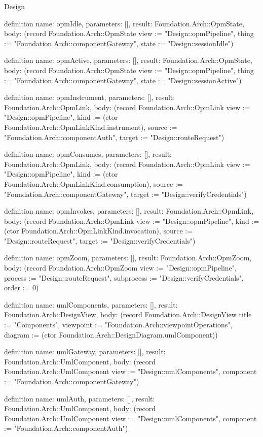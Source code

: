 \begin{lexlean}{Design}
\begin{semanticmodule}
definition{
  name: opmIdle,
  parameters: [],
  result: Foundation.Arch::OpmState,
  body: (record Foundation.Arch::OpmState {view := "Design::opmPipeline", thing := "Foundation.Arch::componentGateway", state := "Design::sessionIdle"})
}

definition{
  name: opmActive,
  parameters: [],
  result: Foundation.Arch::OpmState,
  body: (record Foundation.Arch::OpmState {view := "Design::opmPipeline", thing := "Foundation.Arch::componentGateway", state := "Design::sessionActive"})
}

definition{
  name: opmInstrument,
  parameters: [],
  result: Foundation.Arch::OpmLink,
  body: (record Foundation.Arch::OpmLink {view := "Design::opmPipeline", kind := (ctor Foundation.Arch::OpmLinkKind.instrument), source := "Foundation.Arch::componentAuth", target := "Design::routeRequest"})
}

definition{
  name: opmConsumes,
  parameters: [],
  result: Foundation.Arch::OpmLink,
  body: (record Foundation.Arch::OpmLink {view := "Design::opmPipeline", kind := (ctor Foundation.Arch::OpmLinkKind.consumption), source := "Foundation.Arch::componentGateway", target := "Design::verifyCredentials"})
}

definition{
  name: opmInvokes,
  parameters: [],
  result: Foundation.Arch::OpmLink,
  body: (record Foundation.Arch::OpmLink {view := "Design::opmPipeline", kind := (ctor Foundation.Arch::OpmLinkKind.invocation), source := "Design::routeRequest", target := "Design::verifyCredentials"})
}

definition{
  name: opmZoom,
  parameters: [],
  result: Foundation.Arch::OpmZoom,
  body: (record Foundation.Arch::OpmZoom {view := "Design::opmPipeline", process := "Design::routeRequest", subprocess := "Design::verifyCredentials", order := 0})
}

definition{
  name: umlComponents,
  parameters: [],
  result: Foundation.Arch::DesignView,
  body: (record Foundation.Arch::DesignView {title := "Components", viewpoint := "Foundation.Arch::viewpointOperations", diagram := (ctor Foundation.Arch::DesignDiagram.umlComponent)})
}

definition{
  name: umlGateway,
  parameters: [],
  result: Foundation.Arch::UmlComponent,
  body: (record Foundation.Arch::UmlComponent {view := "Design::umlComponents", component := "Foundation.Arch::componentGateway"})
}

definition{
  name: umlAuth,
  parameters: [],
  result: Foundation.Arch::UmlComponent,
  body: (record Foundation.Arch::UmlComponent {view := "Design::umlComponents", component := "Foundation.Arch::componentAuth"})
}


\end{semanticmodule}
\end{lexlean}
